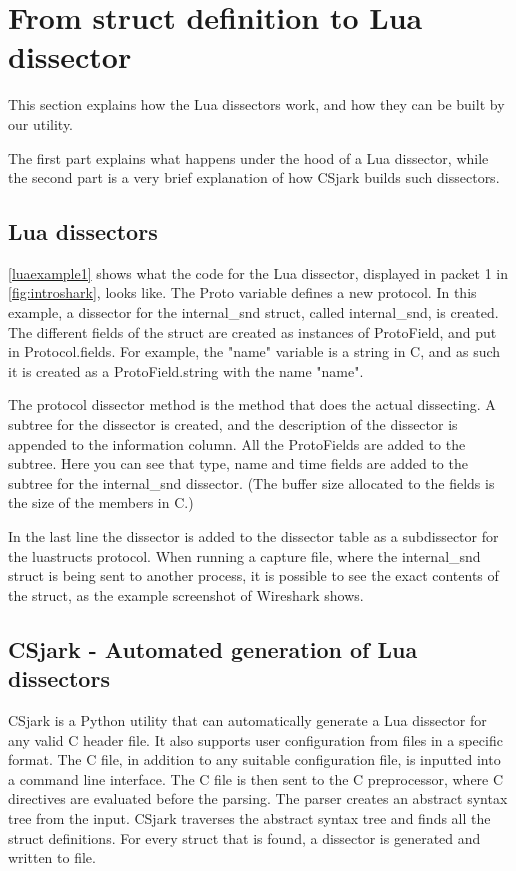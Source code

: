 

\section*{From struct definition to Lua dissector}
This section explains how the Lua dissectors work, and how they can be built by our utility.

The first part explains what happens under the hood of a Lua dissector, while 
the second part is a very brief explanation of how CSjark builds such dissectors.

\subsection*{Lua dissectors}

\autoref{luaexample1} shows what the code for the Lua dissector, displayed in packet 1 in \autoref{fig:introshark}, looks like.
The Proto variable defines a new protocol. In this example, a dissector for the internal\_snd struct, called internal\_snd, is created. 
The different fields of the struct are created as instances of ProtoField, and put in Protocol.fields.
For example, the "name" variable is a string in C, and as such it is created as a ProtoField.string with the 
name "name".

The protocol dissector method is the method that does the actual dissecting.
A subtree for the dissector is created, and the description of the dissector is appended to the information column.
All the ProtoFields are added to the subtree. Here you can see that type, name and time fields are added to the subtree for the internal\_snd dissector.
(The buffer size allocated to the fields is the size of the members in C.)

In the last line the dissector is added to the dissector table as a subdissector for the luastructs protocol.
When running a capture file, where the internal\_snd struct is being sent to another process, it is possible to see the exact contents of the struct, as the example screenshot of Wireshark shows.



\subsection*{CSjark - Automated generation of Lua dissectors}
CSjark is a Python utility that can automatically generate a Lua dissector for 
any valid C header file. It also supports user configuration from files in a specific format.
The C file, in addition to any suitable configuration file, is inputted into a command line interface.
The C file is then sent to the C preprocessor, where C directives are evaluated before the parsing.
The parser creates an abstract syntax tree from the input.
CSjark traverses the abstract syntax tree and finds all the struct definitions.
For every struct that is found, a dissector is generated and written to file.






